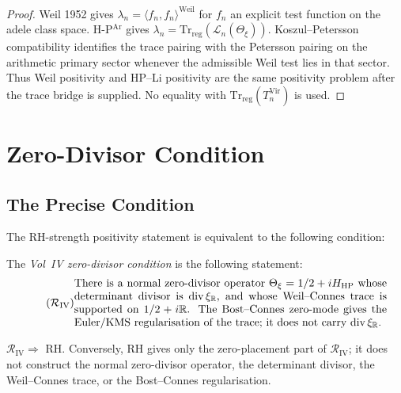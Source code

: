 \begin{proof}
Weil 1952 gives \(\lambda_{n}=\langle f_{n},f_{n}\rangle^{\mathrm{Weil}}\)
for \(f_{n}\) an explicit test function on the adele class space.
H-P\(^{\mathrm{Ar}}\) gives
\(\lambda_{n}=\mathrm{Tr}_{\mathrm{reg}}(\mathcal L_n(\Theta_{\xi}))\).
Koszul--Petersson compatibility identifies the trace pairing with the
Petersson pairing on the arithmetic primary sector whenever the
admissible Weil test lies in that sector. Thus Weil positivity and
HP--Li positivity are the same positivity problem after the trace
bridge is supplied. No equality with
\(\mathrm{Tr}_{\mathrm{reg}}(T_{n}^{\mathrm{Vir}})\) is used.
\end{proof}

\section{Zero-Divisor Condition}
\label{v4-arith:vb:residual-obstruction}

\subsection{The Precise Condition}
\label{v4-arith:vb:precise-residual}

The RH-strength positivity statement is equivalent to the following
condition:

\begin{definition}
\label{v4-arith:vb:def:residual}
The \emph{Vol~IV zero-divisor condition} is
the following statement:
\begin{equation}
\label{v4-arith:vb:eq:residual}
\tag{\(\mathcal{R}_{\mathrm{IV}}\)}
\parbox{0.82\linewidth}{%
There is a normal zero-divisor operator
\(\Theta_{\xi}=1/2+iH_{\mathrm{HP}}\) whose determinant divisor is
\(\mathrm{div}\,\xi_{\mathbb R}\), and whose
Weil--Connes trace is supported on
\(1/2+i\mathbb R\). The Bost--Connes zero-mode gives the Euler/KMS
regularisation of the trace; it does not carry
\(\mathrm{div}\,\xi_{\mathbb R}\).%
}
\end{equation}
\end{definition}

\begin{theorem}
\label{v4-arith:vb:thm:residual-is-RH}
\(\mathcal{R}_{\mathrm{IV}}\Rightarrow\) RH.
Conversely, RH gives only the zero-placement part of
\(\mathcal{R}_{\mathrm{IV}}\); it does not construct the normal
zero-divisor operator, the determinant divisor, the Weil--Connes
trace, or the Bost--Connes regularisation.
\end{theorem}


